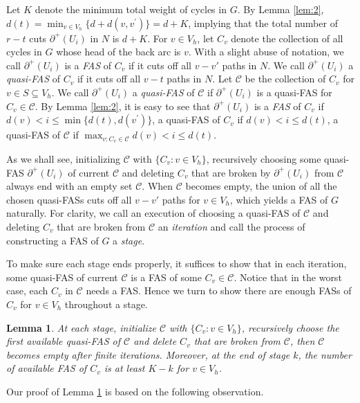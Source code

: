 \documentclass[11pt]{article}
\newtheorem{lemma}[theorem]{Lemma}
\begin{document}
Let $K$ denote the minimum total weight of cycles in $G$. By Lemma \ref{lem:2}, $d(t)=\min_{v\in V_h}\{d+d(v,v^\prime)\}=d+K$, implying that the total number of $r-t$ cuts $\partial^+(U_i)$ in $N$ is $d+K$.
For $v\in V_h$, let $C_v$ denote the collection of all cycles in $G$ whose head of the back arc is $v$. With a slight abuse of notation, we call $\partial^+(U_i)$ is a \emph{FAS} of $C_v$ if it cuts off all $v-v'$ paths in $N$. We call $\partial^+(U_i)$ a \emph{quasi-FAS} of $C_v$ if it cuts off all $v-t$ paths in $N$. Let $\mathcal{C}$ be the collection of $C_v$ for $v\in S\subseteq V_h$. We call $\partial^+(U_i)$ a \emph{quasi-FAS} of $\mathcal{C}$ if $\partial^+(U_i)$ is a quasi-FAS for $C_v\in\mathcal{C}$. By Lemma \ref{lem:2}, it is easy to see that $\partial^+(U_i)$ is a \emph{FAS} of $C_v$ if $d(v)<i\leq \min\{d(t),d(v^\prime)\}$, a quasi-FAS of $C_v$ if $d(v) <i\leq d(t)$, a quasi-FAS of $\mathcal{C}$ if $\max_{v:C_v\in \mathcal{C}}d(v)<i\leq d(t)$.

 As we shall see, initializing $\mathcal{C}$ with $\{C_v: v\in V_h\}$, recursively choosing some quasi-FAS $\partial^+(U_i)$ of current $\mathcal{C}$ and deleting $C_v$ that are broken by $\partial^+(U_i)$ from $\mathcal{C}$ always end with an empty set $\mathcal{C}$.
 When $\mathcal{C}$ becomes empty, the union of all the chosen quasi-FASs cuts off all $v-v'$ paths for $v\in V_h$, which yields a FAS of $G$ naturally.
 For clarity, we call an execution of choosing a quasi-FAS of $\mathcal{C}$ and deleting $C_v$ that are broken from $\mathcal{C}$ an \emph{iteration} and call the process of constructing a FAS of $G$ a \emph{stage}.

To make sure each stage ends properly, it suffices to show that in each iteration, some quasi-FAS of current $\mathcal{C}$ is a FAS of some $C_v\in\mathcal{C}$. Notice that in the worst case, each $C_v$ in $\mathcal{C}$ needs a FAS. Hence we turn to show there are enough FASs of $C_v$ for $v\in V_h$ throughout a stage.

\begin{lemma} 
\label{lem:3}
At each stage, initialize $\mathcal{C}$ with $\{C_v:v\in V_h\}$, recursively choose the first available quasi-FAS of $\mathcal{C}$ and delete $C_v$ that are broken from $\mathcal{C}$, then $\mathcal{C}$ becomes empty after finite iterations. Moreover, at the end of stage $k$, the number of available FAS of $C_v$ is at least $K-k$ for $v\in V_h$.
\end{lemma}

Our proof of Lemma \ref{lem:3} is based on the following observation. 
\end{document}
